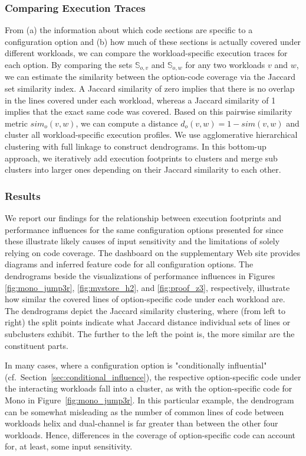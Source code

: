 {{\subsubsection{Comparing Execution Traces}
From (a) the information about which code sections are specific to a configuration option and (b) how much of these sections is actually covered under different workloads, we can compare the workload-specific execution traces for each option. By comparing the sets $\mathbb{S}_{o, v}$ and $\mathbb{S}_{o, w}$ for any two workloads $v$ and $w$, we can estimate the similarity between the option-code coverage via the Jaccard set similarity index. A Jaccard similarity of zero implies that there is no overlap in the lines covered under each workload, whereas a Jaccard similarity of 1 implies that the exact same code was covered. Based on this pairwise similarity metric $sim_o(v, w)$, we can compute a distance $d_o(v, w) = 1 - sim(v, w)$ and cluster all workload-specific execution profiles. 
We use agglomerative hierarchical clustering with full linkage to construct dendrograms. In this bottom-up approach, we iteratively add execution footprints to clusters and merge sub clusters into larger ones depending on their Jaccard similarity  to each other. 

\subsubsection{Results}\label{sec:results3}
We report our findings for the relationship between execution footprints and performance influences for the same configuration options presented for  since these illustrate likely causes of input sensitivity and the limitations of solely relying on code coverage. The dashboard on the supplementary Web site provides diagrams and inferred feature code for all configuration options. The dendrograms beside the visualizations of performance influences in Figures \ref{fig:mono_jump3r}, \ref{fig:mvstore_h2}, and \ref{fig:proof_z3}, respectively, illustrate how similar the covered lines of option-specific code under each workload are. 
{\color{blue} The dendrograms depict the Jaccard similarity clustering, where (from left to right) the split points indicate what Jaccard distance individual sets of lines or subclusters exhibit. The further to the left the point is, the more similar are the constituent parts.}

In many cases, where  a configuration option is "conditionally influential" (cf.~Section~\ref{sec:conditional_influence}), the respective option-specific code under the interacting workloads fall into a cluster, as with the option-specific code for \textsf{Mono} in Figure~\ref{fig:mono_jump3r}. In this particular example, the dendrogram can be somewhat misleading as the number of common lines of code between workloads helix and dual-channel is far greater than between the other four workloads. Hence, differences in the coverage of option-specific code can account for, at least, some input sensitivity.

}}
